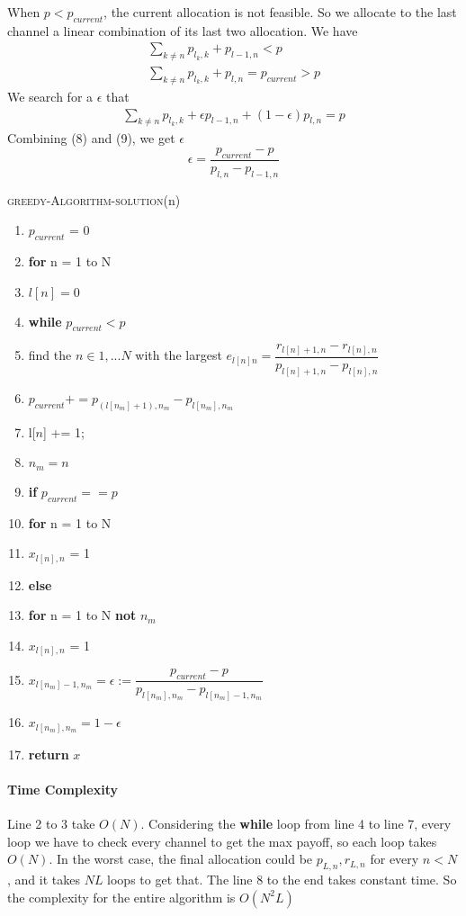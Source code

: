 \documentclass[11pt, oneside]{report}
\begin{document}
When $p < p_{current}$, the current allocation is not feasible. So we allocate to the last channel a linear combination of its last two allocation. We have
\begin{align}
\sum_{k \ne n} p_{l_k,k} + p_{l-1,n} < p \\
\sum_{k \ne n} p_{l_k,k} + p_{l,n} = p_{current} > p
\end{align}
We search for a $\epsilon$ that
\begin{align}
\sum_{k \ne n} p_{l_k,k} + \epsilon p_{l-1,n} + (1-\epsilon) p_{l,n} = p
\end{align}
Combining (8) and (9), we get $\epsilon$
$$ \epsilon = \dfrac{p_{current} - p}{p_{l,n} - p_{l-1,n}}$$

\noindent\textsc{greedy-Algorithm-solution}(n)
\begin{enumerate}[1\ ]
\setlength{\topsep}{0.05ex}
\setlength{\itemsep}{0.05ex}
\item $p_{current}$ = 0
\item \textbf{for} n = 1 to N
\item \qquad $l[n] = 0$
\item \textbf{while} $p_{current} < p$
\item \qquad  find the $n \in {1,...N}$ with the largest $e_{l[n]n} = \dfrac{r_{l[n]+1,n} - r_{l[n],n}}{p_{l[n]+1,n} - p_{l[n],n}}$
\item \qquad  $p_{current} += p_{(l[n_{m}] + 1), n_{m}} - p_{l[n_{m}], n_{m}}$
\item \qquad  l[$n$] += 1;
\item \qquad $n_m = n$
\item \textbf{if} $p_{current} == p$
\item \qquad \textbf{for} n = 1 to N
\item \qquad \qquad $x_{l[n],n}$ = 1
\item \textbf{else}
\item \qquad \textbf{for} n = 1 to N \textbf{not} $n_m$
\item \qquad \qquad $x_{l[n],n}$ = 1
\item \qquad $x_{l[n_m] - 1,n_m} = \epsilon := \dfrac{p_{current} - p}{p_{l[n_m],n_m} - p_{l[n_m]-1,n_m}}$
\item \qquad $x_{l[n_m],n_m} = 1 - \epsilon$
\item \textbf{return} $x$
\end{enumerate}

\paragraph{Time Complexity} Line 2 to 3 take $O(N)$. Considering the \textbf{while} loop from line 4 to line 7, every loop we have to check every channel to get the max payoff, so each loop takes $O(N)$. In the worst case, the final allocation could be $p_{L,n}, r_{L,n}$ for every $n < N$, and it takes $NL$ loops to get that. The line 8 to the end  takes constant time. So the complexity for the entire algorithm is $O(N^2L)$
\end{document}
